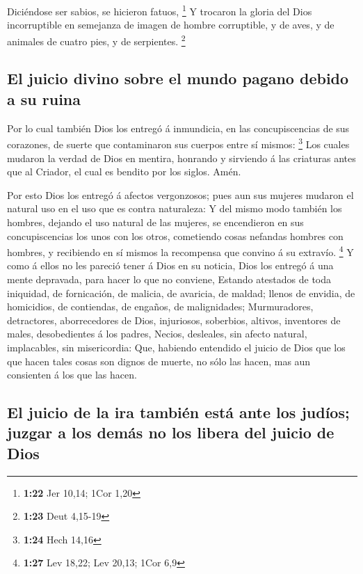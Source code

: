  Diciéndose ser sabios, se hicieron fatuos, \footnote{\textbf{1:22}
  Jer 10,14; 1Cor 1,20}  Y trocaron la gloria del Dios
incorruptible en semejanza de imagen de hombre corruptible, y de aves, y
de animales de cuatro pies, y de serpientes. \footnote{\textbf{1:23}
  Deut 4,15-19}

\hypertarget{el-juicio-divino-sobre-el-mundo-pagano-debido-a-su-ruina}{%
\subsection{El juicio divino sobre el mundo pagano debido a su
ruina}\label{el-juicio-divino-sobre-el-mundo-pagano-debido-a-su-ruina}}

 Por lo cual también Dios los entregó á inmundicia, en
las concupiscencias de sus corazones, de suerte que contaminaron sus
cuerpos entre sí mismos: \footnote{\textbf{1:24} Hech 14,16}
 Los cuales mudaron la verdad de Dios en mentira,
honrando y sirviendo á las criaturas antes que al Criador, el cual es
bendito por los siglos. Amén.

 Por esto Dios los entregó á afectos vergonzosos; pues
aun sus mujeres mudaron el natural uso en el uso que es contra
naturaleza:  Y del mismo modo también los hombres,
dejando el uso natural de las mujeres, se encendieron en sus
concupiscencias los unos con los otros, cometiendo cosas nefandas
hombres con hombres, y recibiendo en sí mismos la recompensa que convino
á su extravío. \footnote{\textbf{1:27} Lev 18,22; Lev 20,13; 1Cor 6,9}
 Y como á ellos no les pareció tener á Dios en su
noticia, Dios los entregó á una mente depravada, para hacer lo que no
conviene,  Estando atestados de toda iniquidad, de
fornicación, de malicia, de avaricia, de maldad; llenos de envidia, de
homicidios, de contiendas, de engaños, de malignidades; 
Murmuradores, detractores, aborrecedores de Dios, injuriosos, soberbios,
altivos, inventores de males, desobedientes á los padres,
 Necios, desleales, sin afecto natural, implacables, sin
misericordia:  Que, habiendo entendido el juicio de Dios
que los que hacen tales cosas son dignos de muerte, no sólo las hacen,
mas aun consienten á los que las hacen.

\hypertarget{el-juicio-de-la-ira-tambiuxe9n-estuxe1-ante-los-juduxedos-juzgar-a-los-demuxe1s-no-los-libera-del-juicio-de-dios}{%
\subsection{El juicio de la ira también está ante los judíos; juzgar a
los demás no los libera del juicio de
Dios}\label{el-juicio-de-la-ira-tambiuxe9n-estuxe1-ante-los-juduxedos-juzgar-a-los-demuxe1s-no-los-libera-del-juicio-de-dios}}

